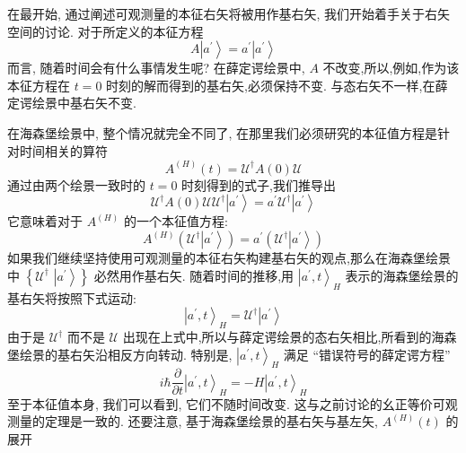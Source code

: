 在最开始, 通过阐述可观测量的本征右矢将被用作基右矢, 我们开始着手关于右矢空间的讨论. 对于所定义的本征方程
\begin{equation}
	A\left| {a}^{\prime }\right\rangle = {a}^{\prime }\left| {a}^{\prime }\right\rangle
\end{equation}
而言, 随着时间会有什么事情发生呢? 在薛定谔绘景中, $A$ 不改变,所以,例如,作为该本征方程在 $t = 0$ 时刻的解而得到的基右矢,必须保持不变. 与态右矢不一样,在薛定谔绘景中基右矢不变.

在海森堡绘景中, 整个情况就完全不同了, 在那里我们必须研究的本征值方程是针对时间相关的算符
\begin{equation}
	{A}^{\left( H\right) }\left( t\right) =\mathcal{U}^{ \dagger }A\left( 0\right)\mathcal{U}
\end{equation}
通过由两个绘景一致时的 $t = 0$ 时刻得到的式子,我们推导出
\begin{equation}
	\mathcal{U}^{ \dagger }A\left( 0\right) \mathcal{U}\mathcal{U}^{ \dagger }\left| {a}^{\prime }\right\rangle = {a}^{\prime }\mathcal{U}^{ \dagger }\left| {a}^{\prime }\right\rangle
\end{equation}
它意味着对于 ${A}^{\left( H\right) }$ 的一个本征值方程:
\begin{equation}
	{A}^{\left( H\right) }\left( {\mathcal{U}^{ \dagger }\left| {a}^{\prime }\right\rangle }\right) = {a}^{\prime }\left( {\mathcal{U}^{ \dagger }\left| {a}^{\prime }\right\rangle }\right)
\end{equation}
如果我们继续坚持使用可观测量的本征右矢构建基右矢的观点,那么在海森堡绘景中 $\left\{ \mathcal{U}^\dagger\right.$ $\left. \left| {a}^{\prime }\right\rangle \right\}$ 必然用作基右矢. 随着时间的推移,用 ${\left| {a}^{\prime }, t\right\rangle }_{H}$ 表示的海森堡绘景的基右矢将按照下式运动:
\begin{equation}\label{2.117}
	{\left| {a}^{\prime }, t\right\rangle }_{H} = \mathcal{U}^{ \dagger }\left| {a}^{\prime }\right\rangle
\end{equation}
由于是 $\mathcal{U}^\dagger$ 而不是 $\mathcal{U}$ 出现在上式中,所以与薛定谔绘景的态右矢相比,所看到的海森堡绘景的基右矢沿相反方向转动. 特别是, ${\left| {a}^{\prime }, t\right\rangle }_{H}$ 满足 “错误符号的薛定谔方程”
\begin{equation}\label{2.118}
	i\hbar \frac{\partial }{\partial t}{\left| {a}^{\prime }, t\right\rangle }_{H} = - H{\left| {a}^{\prime }, t\right\rangle }_{H}
\end{equation}
至于本征值本身, 我们可以看到, 它们不随时间改变. 这与之前讨论的幺正等价可观测量的定理是一致的. 还要注意, 基于海森堡绘景的基右矢与基左矢, ${A}^{\left( H\right) }\left( t\right)$ 的展开
